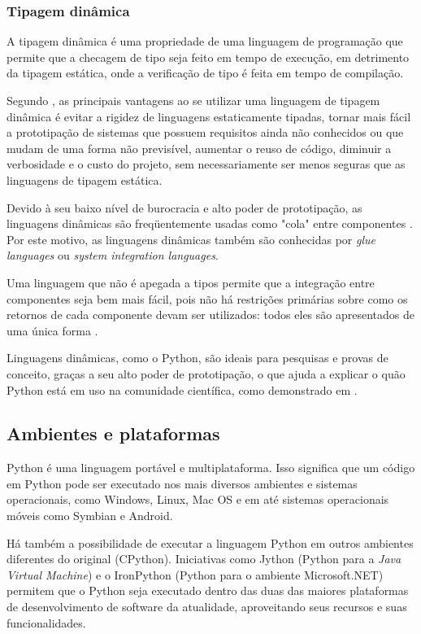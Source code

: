 \subsubsection{Tipagem dinâmica}

A tipagem dinâmica é uma propriedade de uma linguagem de programação que permite que a checagem de tipo seja feito em tempo de execução, em detrimento da tipagem estática, onde a verificação de tipo é feita em tempo de compilação.

Segundo \cite{dynamic_langs}, as principais vantagens ao se utilizar uma linguagem de tipagem dinâmica é evitar a rigidez de linguagens estaticamente tipadas, tornar mais fácil a prototipação de sistemas que possuem requisitos ainda não conhecidos ou que mudam de uma forma não previsível, aumentar o reuso de código, diminuir a verbosidade e o custo do projeto, sem necessariamente ser menos seguras que as linguagens de tipagem estática.

Devido à seu baixo nível de burocracia e alto poder de prototipação, as linguagens dinâmicas são freqüentemente usadas como "cola" entre componentes \cite{scripting}. Por este motivo, as linguagens dinâmicas também são conhecidas por \emph{glue languages} ou \emph{system integration languages}.

Uma linguagem que não é apegada a tipos permite que a integração entre componentes seja bem mais fácil, pois não há restrições primárias sobre como os retornos de cada componente devam ser utilizados: todos eles são apresentados de uma única forma \cite{scripting}.

Linguagens dinâmicas, como o Python, são ideais para pesquisas e provas de conceito, graças a seu alto poder de prototipação, o que ajuda a explicar o quão Python está em uso na comunidade científica, como demonstrado em \cite{python_scientific_world}.

\subsection{Ambientes e plataformas}

Python é uma linguagem portável e multiplataforma. Isso significa que um código em Python pode ser executado nos mais diversos ambientes e sistemas operacionais, como Windows, Linux, Mac OS e em até sistemas operacionais móveis como Symbian e Android.

Há também a possibilidade de executar a linguagem Python em outros ambientes diferentes do original (CPython). Iniciativas como Jython (Python para a \emph{Java Virtual Machine}) e o IronPython (Python para o ambiente Microsoft.NET) permitem que o Python seja executado dentro das duas das maiores plataformas de desenvolvimento de software da atualidade, aproveitando seus recursos e suas funcionalidades. 

